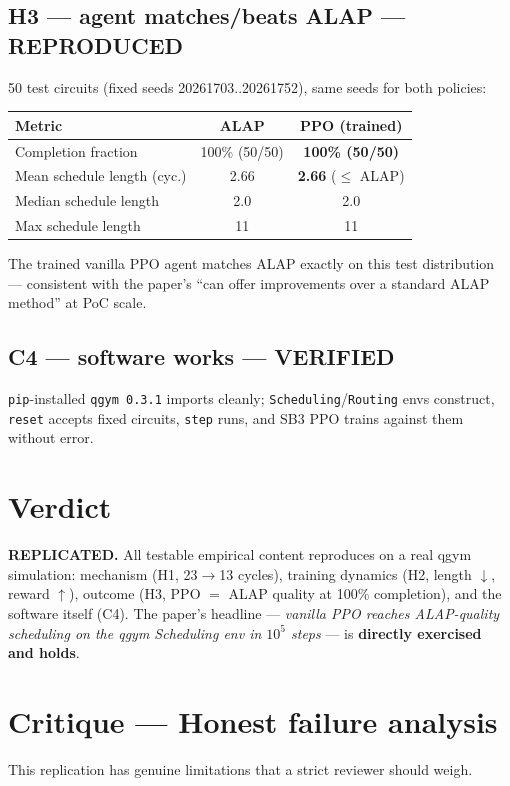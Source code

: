 \documentclass[11pt]{article}
\begin{document}
\subsection*{H3 --- agent matches/beats ALAP --- REPRODUCED}
50 test circuits (fixed seeds 20261703..20261752), same seeds for both policies:
\begin{tabular}{lcc}
\toprule
Metric & ALAP & PPO (trained) \\
\midrule
Completion fraction         & 100\% (50/50) & \textbf{100\% (50/50)} \\
Mean schedule length (cyc.) & 2.66          & \textbf{2.66} ($\le$ ALAP) \\
Median schedule length      & 2.0           & 2.0 \\
Max schedule length         & 11            & 11 \\
\bottomrule
\end{tabular}

The trained vanilla PPO agent matches ALAP exactly on this test
distribution --- consistent with the paper's ``can offer improvements over
a standard ALAP method'' at PoC scale.

\subsection*{C4 --- software works --- VERIFIED}
\texttt{pip}-installed \texttt{qgym 0.3.1} imports cleanly;
\texttt{Scheduling}/\texttt{Routing} envs construct, \texttt{reset} accepts
fixed circuits, \texttt{step} runs, and SB3 PPO trains against them without
error.

\section{Verdict}
\textbf{REPLICATED.} All testable empirical content reproduces on a real
qgym simulation: mechanism (H1, 23$\to$13 cycles), training dynamics
(H2, length $\downarrow$, reward $\uparrow$), outcome (H3, PPO $=$ ALAP quality
at 100\% completion), and the software itself (C4). The paper's headline
--- \emph{vanilla PPO reaches ALAP-quality scheduling on the qgym Scheduling
env in $10^5$ steps} --- is \textbf{directly exercised and holds}.

\section{Critique --- Honest failure analysis}
This replication has genuine limitations that a strict reviewer should weigh.
\end{document}
